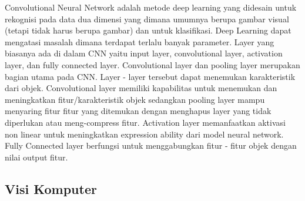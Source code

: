 Convolutional Neural Network adalah metode deep learning yang didesain untuk rekognisi pada data dua dimensi yang dimana umumnya berupa gambar visual (tetapi tidak harus berupa gambar) dan untuk klasifikasi. Deep Learning dapat mengatasi masalah dimana terdapat terlalu banyak parameter.  Layer yang biasanya ada di dalam CNN yaitu input layer, convolutional layer, activation layer, dan fully connected layer.
Convolutional layer dan pooling layer merupakan bagian utama pada CNN. Layer - layer tersebut dapat menemukan karakteristik dari objek. Convolutional layer memiliki kapabilitas untuk menemukan dan meningkatkan fitur/karakteristik objek sedangkan pooling layer mampu menyaring fitur fitur yang ditemukan dengan menghapus layer yang tidak diperlukan atau meng-compress fitur. Activation layer memanfaatkan aktivasi non linear untuk meningkatkan expression ability dari model neural network. Fully Connected layer berfungsi untuk menggabungkan fitur - fitur objek dengan nilai output fitur. \cite{Goodfellow-et-al-2016}







\subsection{Visi Komputer}
\label{sec:visikomputer}

